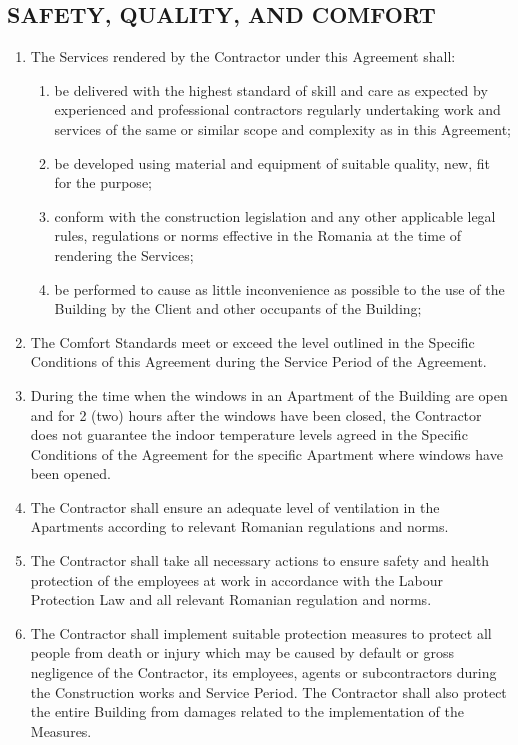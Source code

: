 \begin{multicols}{2}
\subsection{SAFETY, QUALITY, AND COMFORT}
\begin{enumerate}
	\item	The Services rendered by the Contractor under this Agreement shall:
	\begin{enumerate}
		\item	be delivered with the highest standard of skill and care as expected by experienced and professional contractors regularly undertaking work and services of the same or similar scope and complexity as in this Agreement;
		\item	be developed using material and equipment of suitable quality, new, fit for the purpose;
		\item	conform with the construction legislation and any other applicable legal rules, regulations or norms effective in the Romania at the time of rendering the Services;
		\item	be performed to cause as little inconvenience as possible to the use of the Building by the Client and other occupants of the Building;
	\end{enumerate}
	\item	The Comfort Standards meet or exceed the level outlined in the Specific Conditions of this Agreement during the Service Period of the Agreement.
	\item	During the time when the windows in an Apartment of the Building are open and for 2 (two) hours after the windows have been closed, the Contractor does not guarantee the indoor temperature levels agreed in the Specific Conditions of the Agreement for the specific Apartment where windows have been opened.
	\item	The Contractor shall ensure an adequate level of ventilation in the Apartments according to relevant Romanian regulations and norms.
	\item	The Contractor shall take all necessary actions to ensure safety and health protection of the employees at work in accordance with the Labour Protection Law and all relevant Romanian regulation and norms.
	\item	The Contractor shall implement suitable protection measures to protect all people from death or injury which may be caused by default or gross negligence of the Contractor, its employees, agents or subcontractors during the Construction works and Service Period. The Contractor shall also protect the entire Building from damages related to the implementation of the Measures.

\end{enumerate}
\end{multicols}
